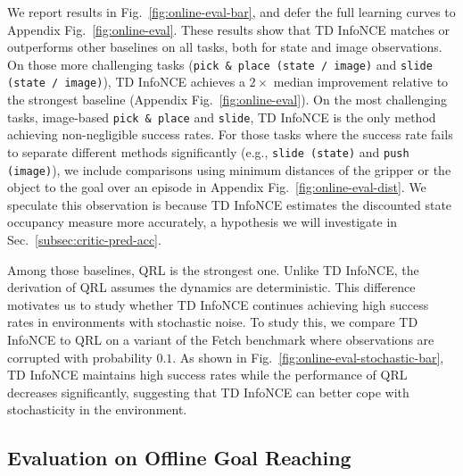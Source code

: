 \documentclass{article} %
\begin{document}
We report results in Fig.~\ref{fig:online-eval-bar}, and defer the full learning curves to Appendix Fig.~\ref{fig:online-eval}. These results show that TD InfoNCE matches or outperforms other baselines on all tasks, both for state and image observations. On those more challenging tasks (\texttt{pick \& place (state / image)} and \texttt{slide (state / image)}), TD InfoNCE achieves a $2\times$ median improvement relative to the strongest baseline (Appendix Fig.~\ref{fig:online-eval}). On the most challenging tasks, image-based \texttt{pick \& place} and \texttt{slide}, TD InfoNCE is the only method achieving non-negligible success rates. For those tasks where the success rate fails to separate different methods significantly (e.g., \texttt{slide (state)} and \texttt{push (image)}), we include comparisons using minimum distances of the gripper or the object to the goal over an episode in Appendix Fig.~\ref{fig:online-eval-dist}. We speculate this observation is because TD InfoNCE estimates the discounted state occupancy measure more accurately, a hypothesis we will investigate in Sec.~\ref{subsec:critic-pred-acc}.

Among those baselines, QRL is the strongest one. Unlike TD InfoNCE, the derivation of QRL assumes the dynamics are deterministic.
This difference motivates us to study whether TD InfoNCE continues achieving high success rates in environments with stochastic noise. To study this, we compare TD InfoNCE to QRL on a variant of the Fetch benchmark where observations are corrupted with probability $0.1$. As shown in Fig.~\ref{fig:online-eval-stochastic-bar}, TD InfoNCE maintains high success rates while the performance of QRL decreases significantly, suggesting that TD InfoNCE can better cope with stochasticity in the environment.

\subsection{Evaluation on Offline Goal Reaching}
\end{document}
